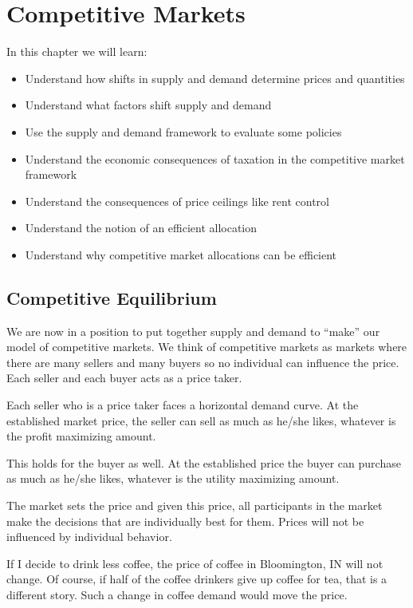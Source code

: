 \documentclass[
]{book}
\providecommand{\tightlist}{%
  \setlength{\itemsep}{0pt}\setlength{\parskip}{0pt}}
\begin{document}
\hypertarget{competitive-markets}{%
\chapter{Competitive Markets}\label{competitive-markets}}

In this chapter we will learn:

\begin{itemize}
\tightlist
\item
  Understand how shifts in supply and demand determine prices and quantities
\item
  Understand what factors shift supply and demand
\item
  Use the supply and demand framework to evaluate some policies
\item
  Understand the economic consequences of taxation in the competitive market framework
\item
  Understand the consequences of price ceilings like rent control
\item
  Understand the notion of an efficient allocation
\item
  Understand why competitive market allocations can be efficient
\end{itemize}

\hypertarget{competitive-equilibrium}{%
\section{Competitive Equilibrium}\label{competitive-equilibrium}}

We are now in a position to put together supply and demand to ``make'' our model of competitive markets. We think of competitive markets as markets where there are many sellers and many buyers so no individual can influence the price. Each seller and each buyer acts as a price taker.

Each seller who is a price taker faces a horizontal demand curve. At the established market price, the seller can sell as much as he/she likes, whatever is the profit maximizing amount.

This holds for the buyer as well. At the established price the buyer can purchase as much as he/she likes, whatever is the utility maximizing amount.

The market sets the price and given this price, all participants in the market make the decisions that are individually best for them. Prices will not be influenced by individual behavior.

If I decide to drink less coffee, the price of coffee in Bloomington, IN will not change. Of course, if half of the coffee drinkers give up coffee for tea, that is a different story. Such a change in coffee demand would move the price.
\end{document}
